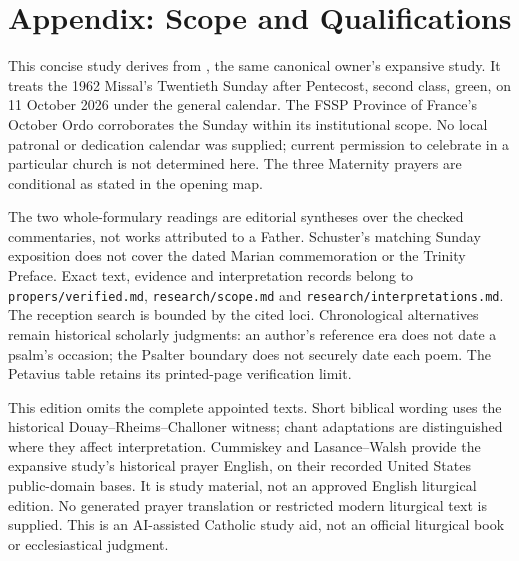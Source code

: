 \section{Appendix: Scope and Qualifications}
This concise study derives from ,
the same canonical owner's expansive study. It treats the 1962 Missal's
Twentieth Sunday after Pentecost, second class, green, on 11 October
2026 under the general calendar. The FSSP Province of France's October
Ordo corroborates the Sunday within its institutional scope. No local
patronal or dedication calendar was supplied; current permission to
celebrate in a particular church is not determined here. The three
Maternity prayers are conditional as stated in the opening map.

The two whole-formulary readings are editorial syntheses over the
checked commentaries, not works attributed to a Father. Schuster's
matching Sunday exposition does not cover the dated Marian commemoration
or the Trinity Preface. Exact text, evidence and interpretation records
belong to \texttt{propers/verified.md}, \texttt{research/scope.md} and
\texttt{research/interpretations.md}. The reception search is bounded
by the cited loci. Chronological alternatives remain historical scholarly
judgments: an author's reference era does not date a psalm's occasion;
the Psalter boundary does not securely date each poem. The Petavius
table retains its printed-page verification limit.

This edition omits the complete appointed texts. Short biblical wording
uses the historical Douay--Rheims--Challoner witness; chant adaptations
are distinguished where they affect interpretation. Cummiskey and
Lasance--Walsh provide the expansive study's historical prayer English,
on their recorded United States public-domain bases. It is study material,
not an approved English liturgical edition. No generated prayer translation
or restricted modern liturgical text is supplied. This is an AI-assisted
Catholic study aid, not an official liturgical book or ecclesiastical judgment.

